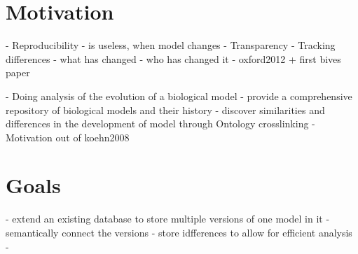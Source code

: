 \section{Motivation}
- Reproducibility
	- \sedml is useless, when model changes
- Transparency
- Tracking differences
	- what has changed
	- who has changed it
	- oxford2012 + first bives paper
	
- Doing analysis of the evolution of a biological model
- provide a comprehensive repository of biological models and their history
- discover similarities and differences in the development of model through Ontology crosslinking
- Motivation out of koehn2008 \cite{Kohn2008}

\section{Goals}
- extend an existing database to store multiple versions of one model in it
- semantically connect the versions
- store idfferences to allow for efficient analysis
- 